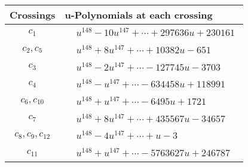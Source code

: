 \documentclass[1p]{elsarticle_modified}
\theoremstyle{definition}
\begin{document}
\begin{tabular}{m{50pt}|m{274pt}}
Crossings & \hspace{64pt}u-Polynomials at each crossing \\
\hline $$\begin{aligned}c_{1}\end{aligned}$$&$\begin{aligned}
&u^{148}-10 u^{147}+\cdots+297636 u+230161
\end{aligned}$\\
\hline $$\begin{aligned}c_{2},c_{5}\end{aligned}$$&$\begin{aligned}
&u^{148}+8 u^{147}+\cdots+10382 u-651
\end{aligned}$\\
\hline $$\begin{aligned}c_{3}\end{aligned}$$&$\begin{aligned}
&u^{148}-2 u^{147}+\cdots-127745 u-3703
\end{aligned}$\\
\hline $$\begin{aligned}c_{4}\end{aligned}$$&$\begin{aligned}
&u^{148}- u^{147}+\cdots-634458 u+118991
\end{aligned}$\\
\hline $$\begin{aligned}c_{6},c_{10}\end{aligned}$$&$\begin{aligned}
&u^{148}+u^{147}+\cdots-6495 u+1721
\end{aligned}$\\
\hline $$\begin{aligned}c_{7}\end{aligned}$$&$\begin{aligned}
&u^{148}+8 u^{147}+\cdots+435567 u-34657
\end{aligned}$\\
\hline $$\begin{aligned}c_{8},c_{9},c_{12}\end{aligned}$$&$\begin{aligned}
&u^{148}-4 u^{147}+\cdots+u-3
\end{aligned}$\\
\hline $$\begin{aligned}c_{11}\end{aligned}$$&$\begin{aligned}
&u^{148}+u^{147}+\cdots-5763627 u+246787
\end{aligned}$\\
\hline
\end{tabular}\\~\\
\end{document}
